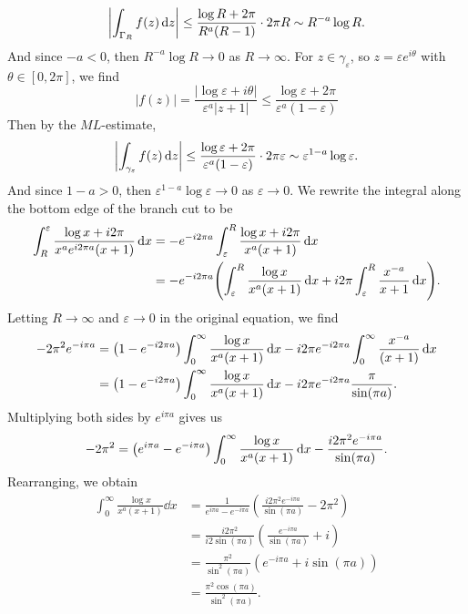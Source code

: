 \documentclass[12pt]{article}
\theoremstyle{definition}
\newcommand{\eps}{\varepsilon}
\begin{document}
\[
    \qty|\int_{\Gamma_R} f(z) \dd{z}|
        \leq \frac{\log R + 2\pi}{R^a(R - 1)} \cdot 2\pi R
        \sim R^{-a} \log R.
\]
And since $-a < 0$, then $R^{-a} \log R \to 0$ as $R \to \infty$. For $z \in \gamma_\eps$, so $z = \eps e^{i\theta}$ with $\theta \in [0, 2\pi]$, we find
\[
    |f(z)|
        = \frac{|\log \eps + i\theta|}{\eps^a|z + 1|}
        \leq \frac{\log \eps + 2\pi}{\eps^a(1 - \eps)}
\]
Then by the $ML$-estimate,
\[
    \qty|\int_{\gamma_\eps} f(z) \dd{z}|
        \leq \frac{\log \eps + 2\pi}{\eps^a(1 - \eps)} \cdot2\pi \eps
        \sim \eps^{1-a} \log\eps.
\]
And since $1 - a > 0$, then $\eps^{1-a} \log\eps \to 0$ as $\eps \to 0$. We rewrite the integral along the bottom edge of the branch cut to be
\begin{align*}
    \int_{R}^{\eps} \frac{\log x + i2\pi}{x^ae^{i2\pi a}(x + 1)} \dd{x}
        &= -e^{-i2\pi a} \int_{\eps}^{R} \frac{\log x + i2\pi}{x^a(x + 1)} \dd{x} \\
        &= -e^{-i2\pi a} \qty(\int_{\eps}^{R} \frac{\log x}{x^a(x + 1)} \dd{x} + i2\pi \int_{\eps}^{R} \frac{x^{-a}}{x + 1} \dd{x}).
\end{align*}
Letting $R \to \infty$ and $\eps \to 0$ in the original equation, we find
\begin{align*}
    -2\pi^2e^{-i\pi a}
        &= \qty(1 - e^{-i2\pi a}) \int_{0}^{\infty} \frac{\log x}{x^a(x + 1)} \dd{x}
            - i2\pi e^{-i2\pi a} \int_{0}^{\infty} \frac{x^{-a}}{(x + 1)} \dd{x} \\
        &= \qty(1 - e^{-i2\pi a}) \int_{0}^{\infty} \frac{\log x}{x^a(x + 1)} \dd{x}
            - i2\pi e^{-i2\pi a} \frac{\pi}{\sin(\pi a)}.
\end{align*}
Multiplying both sides by $e^{i\pi a}$ gives us
\[
    -2\pi^2
        = \qty(e^{i\pi a} - e^{-i\pi a}) \int_{0}^{\infty} \frac{\log x}{x^a(x + 1)} \dd{x}
            - \frac{i2\pi^2 e^{-i\pi a} }{\sin(\pi a)}.
\]
Rearranging, we obtain
\begin{align*}
    \int_{0}^{\infty} \frac{\log x}{x^a(x + 1)} \dd{x}
        &= \frac{1}{e^{i\pi a} - e^{-i\pi a}}\left(\frac{i2\pi^2 e^{-i\pi a} }{\sin(\pi a)} - 2\pi^2\right) \\
        &=  \frac{i2\pi^2}{i2\sin(\pi a)}\left(\frac{e^{-i\pi a}}{\sin(\pi a)} + i\right) \\
        &=  \frac{\pi^2}{\sin^2(\pi a)}\left(e^{-i\pi a} + i\sin(\pi a)\right) \\
        &=  \frac{\pi^2\cos(\pi a)}{\sin^2(\pi a)}.
\end{align*}
\end{document}
